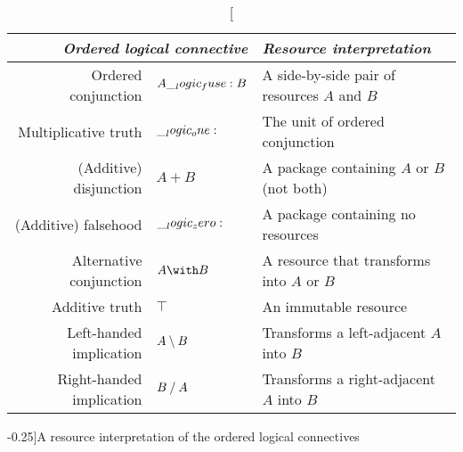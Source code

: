 \begin{table}[tbp]
  \centering
  \begin{tabular}{@{}rll@{}}
    \toprule
    \multicolumn{2}{r}{\emph{Ordered logical connective}} %
      & \emph{Resource interpretation}
    \\ \midrule
    Ordered conjunction & $A \__logic_fuse: B$ & A side-by-side pair of resources $A$ and $B$ %
    \\
    Multiplicative truth & $\__logic_one:$ & The unit of ordered conjunction 
    \\
    (Additive) disjunction & $A \plus B$ & %
      A package containing  $A$ or $B$ (not both)
    \\
    (Additive) falsehood & $\__logic_zero:$ & A package containing no resources 
    \\
    Alternative conjunction & $A \with B$ &%
      A resource that transforms into $A$ or $B$
    \\
    Additive truth & $\top$ & An immutable resource
    \\
    Left-handed implication & $A \mathbin { \setminus } B$ & %
      Transforms a left-adjacent %
      $A$ into %
      $B$ \\
    Right-handed implication & $B \mathbin { / } A$ & %
      Transforms a right-adjacent %
      $A$ into %
      $B$ \\
    \bottomrule
  \end{tabular}
  \caption[][-0.25\baselineskip]{A resource interpretation of the ordered logical connectives}\label{tbl:ordered-logic:resources}
\end{table}

